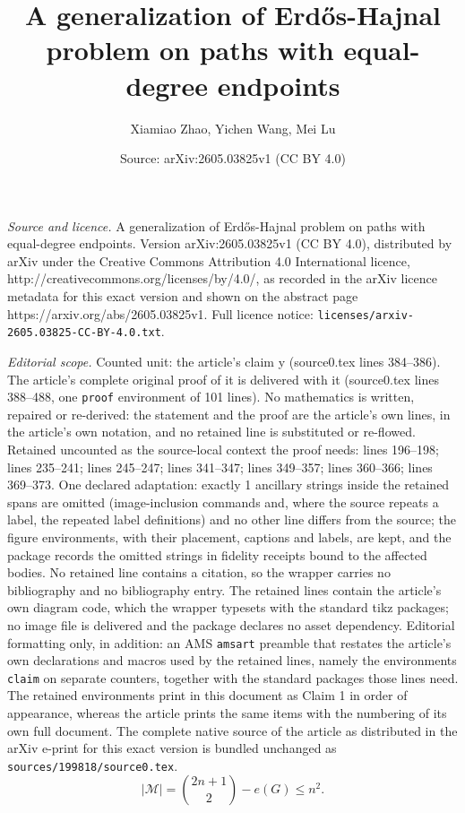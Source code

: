 \documentclass[10pt,a4paper]{amsart}
\title{A generalization of Erd\H{o}s-Hajnal problem on paths with equal-degree endpoints}
\author{Xiamiao Zhao, Yichen Wang, Mei Lu}
\date{Source: arXiv:2605.03825v1 (CC BY 4.0)}
\begin{document}
\maketitle

\noindent\emph{Source and licence.} A generalization of Erd\H{o}s-Hajnal problem on paths with equal-degree endpoints. Version arXiv:2605.03825v1 (CC BY 4.0), distributed by arXiv under the Creative Commons Attribution 4.0 International licence, http://creativecommons.org/licenses/by/4.0/, as recorded in the arXiv licence metadata for this exact version and shown on the abstract page https://arxiv.org/abs/2605.03825v1. Full licence notice: \texttt{licenses/arxiv-2605.03825-CC-BY-4.0.txt}.\par\smallskip

\noindent\textit{Editorial scope.} Counted unit: the article's claim y (source0.tex lines 384--386). The article's complete original proof of it is delivered with it (source0.tex lines 388--488, one \texttt{proof} environment of 101 lines). No mathematics is written, repaired or re-derived: the statement and the proof are the article's own lines, in the article's own notation, and no retained line is substituted or re-flowed.  Retained uncounted as the source-local context the proof needs: lines 196--198; lines 235--241; lines 245--247; lines 341--347; lines 349--357; lines 360--366; lines 369--373.  One declared adaptation: exactly 1 ancillary strings inside the retained spans are omitted (image-inclusion commands and, where the source repeats a label, the repeated label definitions) and no other line differs from the source; the figure environments, with their placement, captions and labels, are kept, and the package records the omitted strings in fidelity receipts bound to the affected bodies.  No retained line contains a citation, so the wrapper carries no bibliography and no bibliography entry.  The retained lines contain the article's own diagram code, which the wrapper typesets with the standard tikz packages; no image file is delivered and the package declares no asset dependency.  Editorial formatting only, in addition: an AMS \texttt{amsart} preamble that restates the article's own declarations and macros used by the retained lines, namely the environments \texttt{claim} on separate counters, together with the standard packages those lines need.  The retained environments print in this document as Claim 1 in order of appearance, whereas the article prints the same items with the numbering of its own full document.  The complete native source of the article as distributed in the arXiv e-print for this exact version is bundled unchanged as \texttt{sources/199818/source0.tex}.
\begin{equation}\label{eq: missing edges}
	|\mathcal{M}| = \binom{2n+1}{2} - e(G)\le n^2.
\end{equation}
\end{document}
